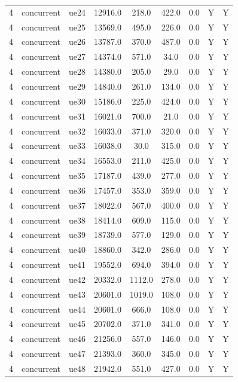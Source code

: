 \begin{table}[ht]
\begin{tabular}{|c|c|c|c|c|c|c|c|c|}
4 & concurrent & ue24 & 12916.0 & 218.0 & 422.0 & 0.0 & Y & Y \\
4 & concurrent & ue25 & 13569.0 & 495.0 & 226.0 & 0.0 & Y & Y \\
4 & concurrent & ue26 & 13787.0 & 370.0 & 487.0 & 0.0 & Y & Y \\
4 & concurrent & ue27 & 14374.0 & 571.0 & 34.0 & 0.0 & Y & Y \\
4 & concurrent & ue28 & 14380.0 & 205.0 & 29.0 & 0.0 & Y & Y \\
4 & concurrent & ue29 & 14840.0 & 261.0 & 134.0 & 0.0 & Y & Y \\
4 & concurrent & ue30 & 15186.0 & 225.0 & 424.0 & 0.0 & Y & Y \\
4 & concurrent & ue31 & 16021.0 & 700.0 & 21.0 & 0.0 & Y & Y \\
4 & concurrent & ue32 & 16033.0 & 371.0 & 320.0 & 0.0 & Y & Y \\
4 & concurrent & ue33 & 16038.0 & 30.0 & 315.0 & 0.0 & Y & Y \\
4 & concurrent & ue34 & 16553.0 & 211.0 & 425.0 & 0.0 & Y & Y \\
4 & concurrent & ue35 & 17187.0 & 439.0 & 277.0 & 0.0 & Y & Y \\
4 & concurrent & ue36 & 17457.0 & 353.0 & 359.0 & 0.0 & Y & Y \\
4 & concurrent & ue37 & 18022.0 & 567.0 & 400.0 & 0.0 & Y & Y \\
4 & concurrent & ue38 & 18414.0 & 609.0 & 115.0 & 0.0 & Y & Y \\
4 & concurrent & ue39 & 18739.0 & 577.0 & 129.0 & 0.0 & Y & Y \\
4 & concurrent & ue40 & 18860.0 & 342.0 & 286.0 & 0.0 & Y & Y \\
4 & concurrent & ue41 & 19552.0 & 694.0 & 394.0 & 0.0 & Y & Y \\
4 & concurrent & ue42 & 20332.0 & 1112.0 & 278.0 & 0.0 & Y & Y \\
4 & concurrent & ue43 & 20601.0 & 1019.0 & 108.0 & 0.0 & Y & Y \\
4 & concurrent & ue44 & 20601.0 & 666.0 & 108.0 & 0.0 & Y & Y \\
4 & concurrent & ue45 & 20702.0 & 371.0 & 341.0 & 0.0 & Y & Y \\
4 & concurrent & ue46 & 21256.0 & 557.0 & 146.0 & 0.0 & Y & Y \\
4 & concurrent & ue47 & 21393.0 & 360.0 & 345.0 & 0.0 & Y & Y \\
4 & concurrent & ue48 & 21942.0 & 551.0 & 427.0 & 0.0 & Y & Y \\

\end{tabular}
\end{table}

